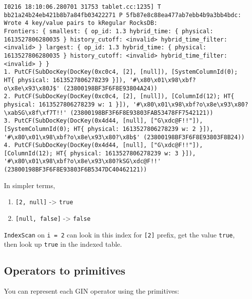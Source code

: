 \documentclass[
]{article}
\providecommand{\tightlist}{%
  \setlength{\itemsep}{0pt}\setlength{\parskip}{0pt}}
\begin{document}
\begin{verbatim}
I0216 18:10:06.280701 31753 tablet.cc:1235] T bb21a24b24eb421b8b7a84fb03422271 P 5fb87e8c88ea477ab7ebb4b9a3bb4bdc: Wrote 4 key/value pairs to kRegular RocksDB:
Frontiers: { smallest: { op_id: 1.3 hybrid_time: { physical: 1613527806280035 } history_cutoff: <invalid> hybrid_time_filter: <invalid> } largest: { op_id: 1.3 hybrid_time: { physical: 1613527806280035 } history_cutoff: <invalid> hybrid_time_filter: <invalid> } }
1. PutCF(SubDocKey(DocKey(0xc0c4, [2], [null]), [SystemColumnId(0); HT{ physical: 1613527806278239 }]), '#\x80\x01\x98\xbf?o\x8e\x93\x80J$' (23800198BF3F6F8E93804A24))
2. PutCF(SubDocKey(DocKey(0xc0c4, [2], [null]), [ColumnId(12); HT{ physical: 1613527806278239 w: 1 }]), '#\x80\x01\x98\xbf?o\x8e\x93\x80?\xabSG\x8f\xf7T!!' (23800198BF3F6F8E93803FAB53478FF7542121))
3. PutCF(SubDocKey(DocKey(0x4d44, [null], ["G\xdc@F!!"]), [SystemColumnId(0); HT{ physical: 1613527806278239 w: 2 }]), '#\x80\x01\x98\xbf?o\x8e\x93\x80?\x8b$' (23800198BF3F6F8E93803F8B24))
4. PutCF(SubDocKey(DocKey(0x4d44, [null], ["G\xdc@F!!"]), [ColumnId(12); HT{ physical: 1613527806278239 w: 3 }]), '#\x80\x01\x98\xbf?o\x8e\x93\x80?kSG\xdc@F!!' (23800198BF3F6F8E93803F6B5347DC40462121))
\end{verbatim}

In simpler terms,

\begin{enumerate}
\def\labelenumi{\arabic{enumi}.}
\tightlist
\item
  \texttt{{[}2,\ null{]}} -\textgreater{} \texttt{true}
\item
  \texttt{{[}null,\ false{]}} -\textgreater{} \texttt{false}
\end{enumerate}

\texttt{IndexScan} on \texttt{i\ =\ 2} can look in this index for
\texttt{{[}2{]}} prefix, get the value \texttt{true}, then look up
\texttt{true} in the indexed table.

\hypertarget{operators-to-primitives}{%
\subsection{Operators to primitives}\label{operators-to-primitives}}

You can represent each GIN operator using the primitives:
\end{document}
